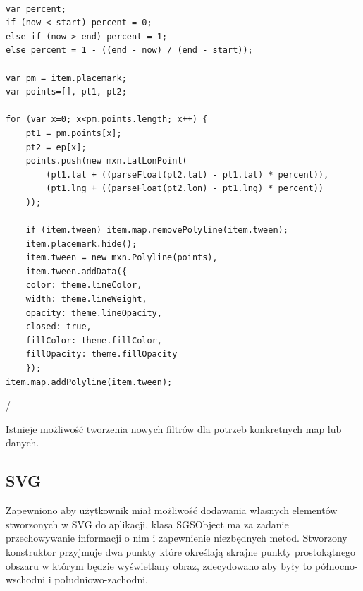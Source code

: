 \lstset{language=JavaScript}
\begin{lstlisting}[label={lst:minconf},caption={Filt animujący.}]

var percent;
if (now < start) percent = 0;
else if (now > end) percent = 1;
else percent = 1 - ((end - now) / (end - start));

var pm = item.placemark;
var points=[], pt1, pt2;

for (var x=0; x<pm.points.length; x++) {
    pt1 = pm.points[x];
    pt2 = ep[x];
    points.push(new mxn.LatLonPoint(
        (pt1.lat + ((parseFloat(pt2.lat) - pt1.lat) * percent)),
        (pt1.lng + ((parseFloat(pt2.lon) - pt1.lng) * percent))
    ));

    if (item.tween) item.map.removePolyline(item.tween);
    item.placemark.hide();
    item.tween = new mxn.Polyline(points),
    item.tween.addData({
    color: theme.lineColor,
    width: theme.lineWeight,
    opacity: theme.lineOpacity,
    closed: true,
    fillColor: theme.fillColor,
    fillOpacity: theme.fillOpacity
    });
item.map.addPolyline(item.tween);
\end{lstlisting}/

Istnieje możliwość tworzenia nowych filtrów dla potrzeb konkretnych map lub danych.

\subsection{SVG}
\label{subsec:svgImpl}

Zapewniono aby użytkownik miał możliwość dodawania własnych elementów stworzonych w SVG do aplikacji, klasa SGSObject ma za zadanie przechowywanie informacji o nim i zapewnienie niezbędnych metod. Stworzony konstruktor przyjmuje dwa punkty które określają skrajne punkty prostokątnego obszaru w którym będzie wyświetlany obraz, zdecydowano aby były to północno-wschodni i południowo-zachodni.


